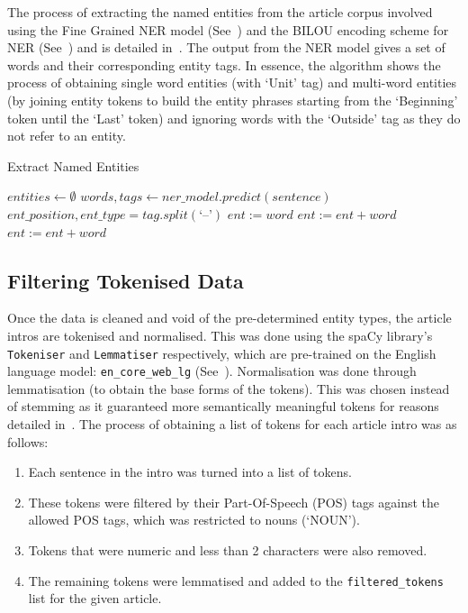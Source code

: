 The process of extracting the named entities from the article corpus involved using the Fine Grained NER model (See~) and the BILOU encoding scheme for NER (See~) and is detailed in~. The output from the NER model gives a set of words and their corresponding entity tags. In essence, the algorithm shows the process of obtaining single word entities (with `Unit' tag) and multi-word entities (by joining entity tokens to build the entity phrases starting from the `Beginning' token until the `Last' token) and ignoring words with the `Outside' tag as they do not refer to an entity.

\begin{algorithm}[H]
  \caption{Extract Named Entities}
  \label{alg:named_ents}
  \begin{algorithmic}   
  \State $\mathit{entities} \leftarrow \emptyset$
  \State $\mathit{words, tags} \leftarrow \mathit{ner\_model.predict}(sentence)$
        \EndIf
    \State $ \mathit{ent\_position, ent\_type} = \mathit{tag.split}(\text{`--'})$
    \Else
      \State $ent := word$
      \State  $\mathit{ent:= ent + word}$
      \State  $\mathit{ent := ent + word} $
      \EndIf
    \EndIf
  \EndFor
\end{algorithmic}
\end{algorithm}

\subsection{Filtering Tokenised Data} \label{filtered_tokens}
Once the data is cleaned and void of the pre-determined entity types, the article intros are tokenised and normalised. This was done using the spaCy library's \texttt{Tokeniser} and \texttt{Lemmatiser} respectively, which are pre-trained on the English language model: \texttt{en\_core\_web\_lg} (See~). Normalisation was done through lemmatisation (to obtain the base forms of the tokens). This was chosen instead of stemming as it guaranteed more semantically meaningful tokens for reasons detailed in~. The process of obtaining a list of tokens for each article intro was as follows:
\begin{enumerate}
    \item Each sentence in the intro was turned into a list of tokens.
    \item These tokens were filtered by their Part-Of-Speech (POS) tags against the allowed POS tags, which was restricted to nouns (`NOUN').
    \item Tokens that were numeric and less than 2 characters were also removed. 
    \item The remaining tokens were lemmatised and added to the \texttt{filtered\_tokens} list for the given article.
\end{enumerate}

